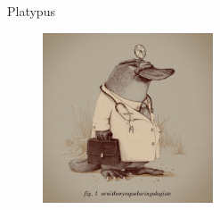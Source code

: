 \documentclass{beamer}
\begin{document}
\begin{frame}[fragile]{Platypus}
  \begin{figure}[h]
    \centering
      \includegraphics[width=0.45\textwidth]{./platy.jpg}
  \end{figure}
\end{frame}
\end{document}
